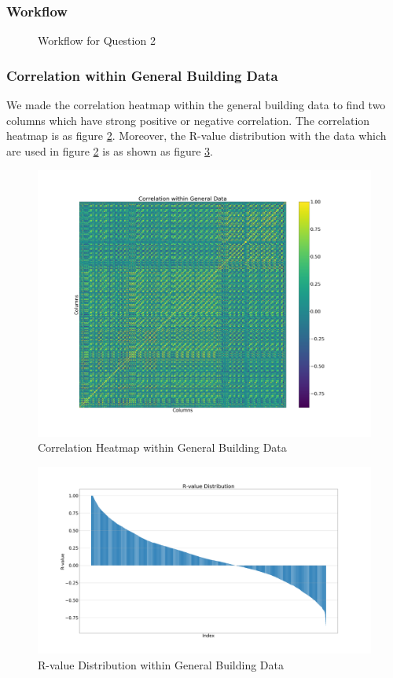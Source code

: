 \documentclass[aps, 10pt, a4paper]{article}
\begin{document}
            \subsubsection{Workflow}
                \begin{figure}[htbp]
                    \centering
                    \begin{tikzpicture}[node distance = 2cm, auto]
                    \end{tikzpicture}
                    \caption{Workflow for Question 2}
                    \label{fig:workflow2}
                \end{figure}
 
            \subsubsection{Correlation within General Building Data} 
                We made the correlation heatmap within the general building data to find two columns which have strong positive or negative correlation. The correlation heatmap is as figure \ref{fig:correlationgeneral}. Moreover, the R-value distribution with the data which are used in figure \ref{fig:correlationgeneral} is as shown as figure \ref{fig:rgeneral}.
                
                \begin{figure}[htbp]
                    \centering
                    \includegraphics[width=0.4 \linewidth]{figures/correlationgeneral.png}
                    \caption{Correlation Heatmap within General Building Data}
                    \label{fig:correlationgeneral}
                \end{figure}
            
                \begin{figure}[htbp]
                    \centering
                    \includegraphics[width=0.5 \linewidth]{figures/rgeneral.png}
                    \caption{R-value Distribution within General Building Data}
                    \label{fig:rgeneral}
                \end{figure}
            
\end{document}
